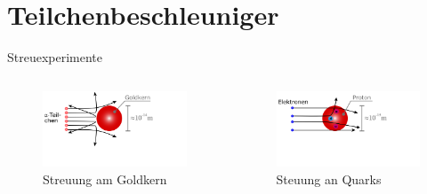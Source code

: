 \documentclass[aspectratio=169,xcolor=dvipsnames]{beamer}
\begin{document}
\section{Teilchenbeschleuniger}
\begin{frame}{Streuexperimente}
    \begin{columns}[c]
        \begin{figure}
            \centering
            \includegraphics[width=1\linewidth]{figures/streuprozess2.png}
            \caption{Streuung am Goldkern}
            \label{fig:Streuung am Goldkern}
        \end{figure}

        \begin{figure}
            \centering
            \includegraphics[width=1\linewidth]{figures/streuprozess1.png}
            \caption{Steuung an Quarks}
            \label{fig:Steuung an Quarks}
        \end{figure}

    \end{columns}
\end{frame}
\end{document}
